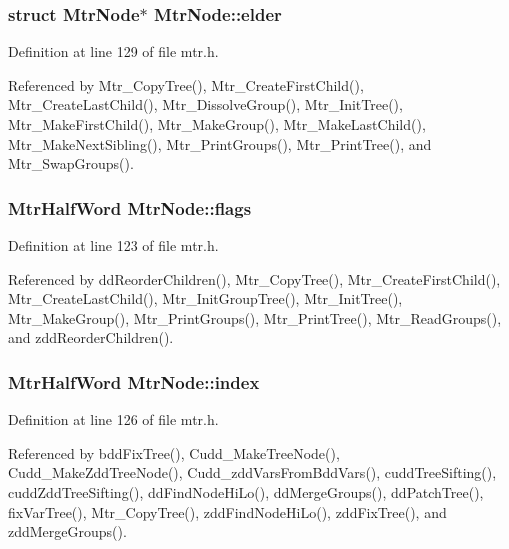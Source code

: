 \subsubsection{\setlength{\rightskip}{0pt plus 5cm}struct \bf{Mtr\-Node}$\ast$ \bf{Mtr\-Node::elder}}\label{structMtrNode_7c8ed9787ec60487fad7b2fede53df98}




Definition at line 129 of file mtr.h.

Referenced by Mtr\_\-Copy\-Tree(), Mtr\_\-Create\-First\-Child(), Mtr\_\-Create\-Last\-Child(), Mtr\_\-Dissolve\-Group(), Mtr\_\-Init\-Tree(), Mtr\_\-Make\-First\-Child(), Mtr\_\-Make\-Group(), Mtr\_\-Make\-Last\-Child(), Mtr\_\-Make\-Next\-Sibling(), Mtr\_\-Print\-Groups(), Mtr\_\-Print\-Tree(), and Mtr\_\-Swap\-Groups().
\subsubsection{\setlength{\rightskip}{0pt plus 5cm}\bf{Mtr\-Half\-Word} \bf{Mtr\-Node::flags}}\label{structMtrNode_729ce47dfa70a8e041a89d478c6565f5}




Definition at line 123 of file mtr.h.

Referenced by dd\-Reorder\-Children(), Mtr\_\-Copy\-Tree(), Mtr\_\-Create\-First\-Child(), Mtr\_\-Create\-Last\-Child(), Mtr\_\-Init\-Group\-Tree(), Mtr\_\-Init\-Tree(), Mtr\_\-Make\-Group(), Mtr\_\-Print\-Groups(), Mtr\_\-Print\-Tree(), Mtr\_\-Read\-Groups(), and zdd\-Reorder\-Children().
\subsubsection{\setlength{\rightskip}{0pt plus 5cm}\bf{Mtr\-Half\-Word} \bf{Mtr\-Node::index}}\label{structMtrNode_d10fa600c59f13e195d295dac071e807}




Definition at line 126 of file mtr.h.

Referenced by bdd\-Fix\-Tree(), Cudd\_\-Make\-Tree\-Node(), Cudd\_\-Make\-Zdd\-Tree\-Node(), Cudd\_\-zdd\-Vars\-From\-Bdd\-Vars(), cudd\-Tree\-Sifting(), cudd\-Zdd\-Tree\-Sifting(), dd\-Find\-Node\-Hi\-Lo(), dd\-Merge\-Groups(), dd\-Patch\-Tree(), fix\-Var\-Tree(), Mtr\_\-Copy\-Tree(), zdd\-Find\-Node\-Hi\-Lo(), zdd\-Fix\-Tree(), and zdd\-Merge\-Groups().
